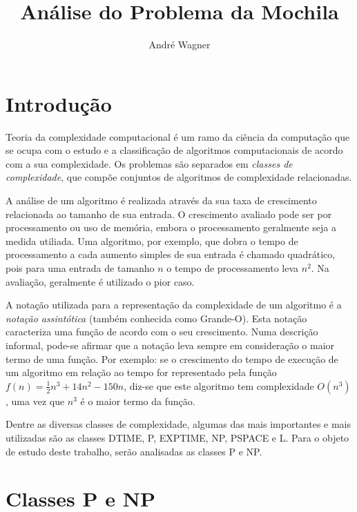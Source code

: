 \documentclass[a4paper,twocolumn]{article}
\author{André Wagner}
\title{Análise do Problema da Mochila}
\date{}
\begin{document}
\maketitle


\section{Introdução}

Teoria da complexidade computacional\cite{sipser05} é um ramo da ciência da computação que se ocupa com o estudo e a classificação de algoritmos computacionais de acordo com a sua complexidade. Os problemas são separados em \emph{classes de complexidade}, que compõe conjuntos de algoritmos de complexidade relacionadas. 

A análise de um algoritmo é realizada através da sua taxa de crescimento relacionada ao tamanho de sua entrada. O crescimento avaliado pode ser por processamento ou uso de memória, embora o processamento geralmente seja a medida utiliada. Uma algoritmo, por exemplo, que dobra o tempo de processamento a cada aumento simples de sua entrada é chamado quadrático, pois para uma entrada de tamanho $n$ o tempo de processamento leva $n^2$. Na avaliação, geralmente é utilizado o pior caso.

A notação utilizada para a representação da complexidade de um algoritmo é a \emph{notação assintótica} (também conhecida como Grande-O). Esta notação caracteriza uma função de acordo com o seu crescimento. Numa descrição informal, pode-se afirmar que a notação leva sempre em consideração o maior termo de uma função. Por exemplo: se o crescimento do tempo de execução de um algoritmo em relação ao tempo for representado pela função $f(n) = \frac{1}{2}n^3 + 14n^2 - 150n$, diz-se que este algoritmo tem complexidade $O(n^3)$, uma vez que $n^3$ é o maior termo da função.

Dentre as diversas classes de complexidade, algumas das mais importantes e mais utilizadas são as classes DTIME, P, EXPTIME, NP, PSPACE e L. Para o objeto de estudo deste trabalho, serão analisadas as classes P e NP.



\section{Classes P e NP}
\end{document}
